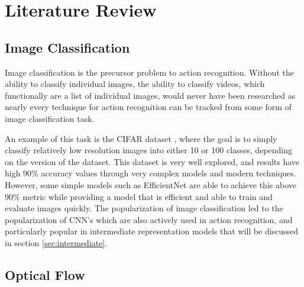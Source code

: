 
\chapter{Literature Review} %

\label{LiteratureReview} %

\section{Image Classification}

Image classification is the precursor problem to action recognition. Without the ability to classify individual images, the ability to classify videos, which functionally are a list of individual images, would never have been researched as nearly every technique for action recognition can be tracked from some form of image classification task.

An example of this task is the CIFAR dataset \cite{cifar}, where the goal is to simply classify relatively low resolution images into either 10 or 100 classes, depending on the version of the dataset. This dataset is very well explored, and results have high 90\% accuracy values through very complex models and modern techniques. However, some simple models such as EfficientNet \cite{efficientnet} are able to achieve this above 90\% metric while providing a model that is efficient and able to train and evaluate images quickly. The popularization of image classification led to the popularization of CNN's which are also actively used in action recognition, and particularly popular in intermediate representation models that will be discussed in section \ref{sec:intermediate}.

\section{Optical Flow}

